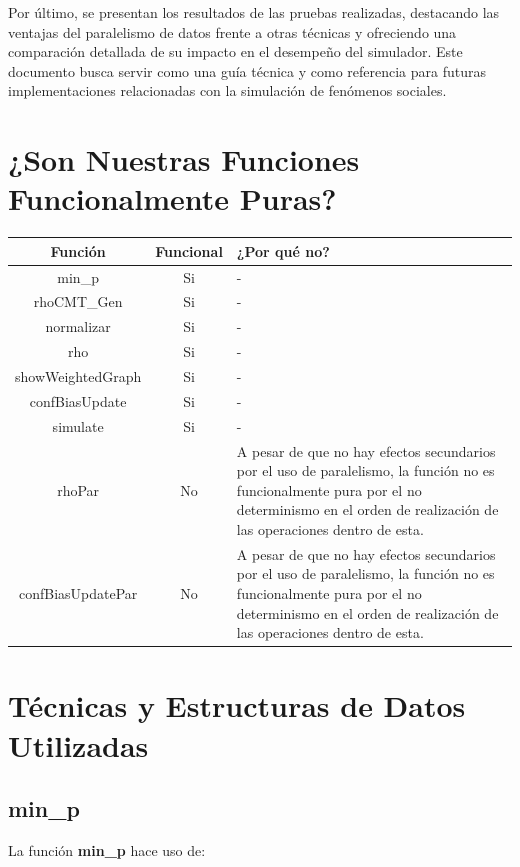 \documentclass{article}
\begin{document}
Por último, se presentan los resultados de las pruebas realizadas, destacando las ventajas del paralelismo de datos frente a otras técnicas y ofreciendo una comparación detallada de su impacto en el desempeño del simulador. Este documento busca servir como una guía técnica y como referencia para futuras implementaciones relacionadas con la simulación de fenómenos sociales.


  \section{¿Son Nuestras Funciones Funcionalmente Puras?}

  \begin{table}[H]
    \centering
    \begin{tabular}{|c|c|p{5cm}|}
    \hline
    \textbf{Función} & \textbf{Funcional} & \textbf{¿Por qué no?} \\ \hline
    min\_p & Si & - \\ \hline
    rhoCMT\_Gen & Si & - \\ \hline
    normalizar & Si & - \\ \hline
    rho & Si & - \\ \hline
    showWeightedGraph & Si & - \\ \hline
    confBiasUpdate & Si & - \\ \hline
    simulate & Si & - \\ \hline
    rhoPar & No & A pesar de que no hay efectos secundarios por el uso de paralelismo, la función no es funcionalmente pura por el no determinismo en el orden de realización de las operaciones dentro de esta. \\ \hline
    confBiasUpdatePar & No & A pesar de que no hay efectos secundarios por el uso de paralelismo, la función no es funcionalmente pura por el no determinismo en el orden de realización de las operaciones dentro de esta. \\ \hline
    \end{tabular}
  \end{table}

  \section{Técnicas y Estructuras de Datos Utilizadas}
    
    \subsection{min\_p}
    La función \textbf{min\_p} hace uso de:
\end{document}
